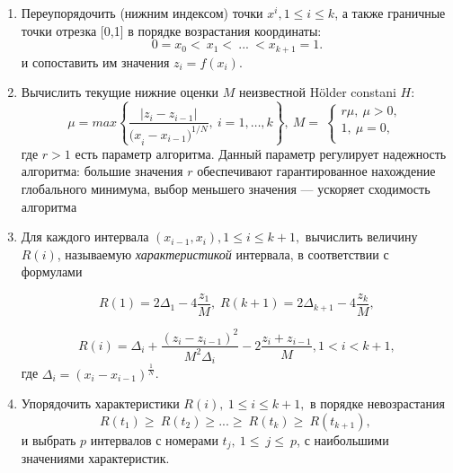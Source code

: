 \documentclass{svproc}
\begin{document}
\begin{enumerate}

\item  Переупорядочить (нижним индексом) точки $x^i, 1\leq i\leq k$, а также граничные точки отрезка [0,1] в порядке возрастания координаты:
 \begin{equation}
\label{agp1_sort}
	0=x_0<\ x_1<\ ...\ <x_{k+1}=1.
	\end{equation}
	и сопоставить им значения $z_i=f(x_i)$. 
	
\item  Вычислить текущие нижние оценки $M$ неизвестной H{\"o}lder constani $H$:
 \begin{equation}
\label{agp2_mu}
	\mu=max\left\{\frac{|z_i-z_{i-1}|}{{{(x}_i-x_{i-1})}^{1/N}},\ i=1,\ldots,k\right\},\ M=\ \left\{\begin{matrix}r\mu,\ \mu>0,\\1,\ \mu=0,\\\end{matrix}\right.\
	\end{equation}
где $r>1$ есть параметр алгоритма. Данный параметр регулирует надежность алгоритма: большие значения $r$ обеспечивают гарантированное нахождение глобального минимума, выбор меньшего значения --- ускоряет сходимость алгоритма
   
\item  Для каждого интервала $(x_{i-1},x_i), 1\leq i\leq k+1,$ вычислить величину $R(i)$, называемую \textit{характеристикой} интервала, в соответствии с формулами

\begin{equation}
\label{agp3_R1}
R(1)=2\Delta_1-4\dfrac{z_1}{M}, \; R(k+1)=2\Delta_{k+1}-4\dfrac{z_k}{M},
\end{equation}

\begin{equation}
\label{agp3_Ri}
R(i)=\Delta_i+\dfrac{(z_i-z_{i-1})^2}{M^2\Delta_i}-2\dfrac{z_i+z_{i-1}}{M},1<i<k+1,
\end{equation}
где \(\Delta_i=(x_i-x_{i-1})^\frac{1}{N}\).
   
\item   Упорядочить характеристики $R\left(i\right),\ 1\leq i \leq k+1,$ в порядке невозрастания 
\begin{equation}
\label{agp4_R_sort}
	R\left(t_1\right)\geq\ R\left(t_2\right)\geq...\geq\ R\left(t_k\right)\geq\ R(t_{k+1}),\ 
\end{equation}	
и выбрать $p$ интервалов с номерами $t_j,\ 1\le\ j\le\ p$, с наибольшими значениями характеристик.


\end{enumerate}
\end{document}
